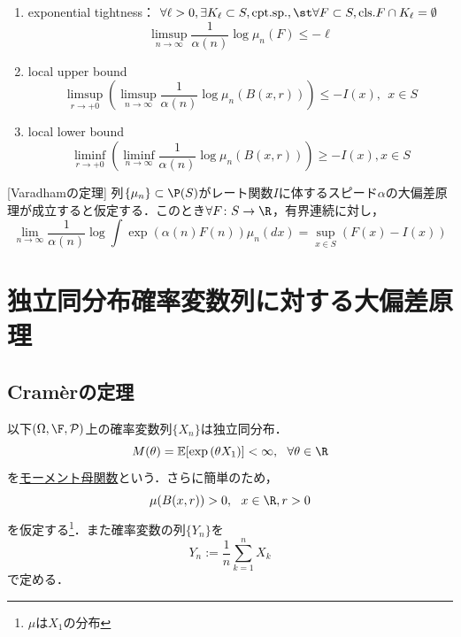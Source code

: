 \begin{enumerate}
    \item exponential tightness：
    $\forall \ell> 0, \exists K_\ell\subset S, \mathrm{cpt. sp.}, \st\forall F\subset S, \mathrm{cls.} F\cap K_\ell= \emptyset$
\begin{equation}
    \limsup_{n\to \infty}\frac{1}{\alpha(n)}\log\mu_n(F)\le -\ell
\end{equation}
    \item local upper bound
\begin{equation}
    \limsup_{r\to +0}\left(\limsup_{n\to \infty} \frac{1}{\alpha(n)}\log\mu_n(B(x, r))\right)\le -I(x),\ \ x\in S
\end{equation}
    \item local lower bound
\begin{equation}
    \liminf_{r\to +0}\left(\liminf_{n\to \infty} \frac{1}{\alpha(n)}\log\mu_n(B(x, r))\right)\ge -I(x), x\in S
\end{equation}
\end{enumerate}

[Varadhamの定理]
    列$\{\mu_n\}\subset \P(S)$がレート関数$I$に体するスピード$\alpha$の大偏差原理が成立すると仮定する．このとき$\forall F\colon S\to \R$，有界連続に対し，
\begin{equation}
    \lim_{n\to \infty}\frac{1}{\alpha(n)}\log\int \exp{(\alpha(n)F(n))}\mu_n(dx)= \sup_{x\in S}(F(x)- I(x))
\end{equation}

\section{独立同分布確率変数列に対する大偏差原理}
\subsection{Cram\`erの定理}
    以下$(\Omega, \F, \mathcal{P})$上の確率変数列$\{X_n\}$は独立同分布．
\begin{equation}
    M(\theta)= \mathbb{E}[\exp{(\theta X_1)}]< \infty,\ \ \forall \theta\in \R
\end{equation}
    を\underline{モーメント母関数}という．さらに簡単のため，
\begin{equation}
    \mu(B(x, r))> 0,\ \ x\in \R, r> 0
\end{equation}
    を仮定する\footnote{$\mu$は$X_1$の分布}．また確率変数の列$\{Y_n\}$を
\begin{equation}
    Y_n:= \frac{1}{n}\sum_{k= 1}^n X_k
\end{equation}
    で定める．


